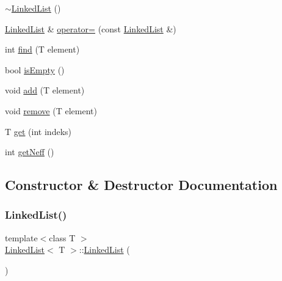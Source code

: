 \begin{DoxyCompactItemize}
\mbox{\hyperlink{classLinkedList_a7c37609df3b83bc4eb0281b852f93fd7}{$\sim$\+Linked\+List}} ()
\item 
\mbox{\hyperlink{classLinkedList}{Linked\+List}} \& \mbox{\hyperlink{classLinkedList_a690c97c1ac796f5cbf0a28bd67fc474c}{operator=}} (const \mbox{\hyperlink{classLinkedList}{Linked\+List}} \&)
\item 
int \mbox{\hyperlink{classLinkedList_a924e217dd525b84492e9f0dc61db96bc}{find}} (T element)
\item 
bool \mbox{\hyperlink{classLinkedList_a7ecbb28e82117a680839ed0dc28ebdce}{is\+Empty}} ()
\item 
void \mbox{\hyperlink{classLinkedList_ab7364799e5965dd59d4f5952cb953287}{add}} (T element)
\item 
void \mbox{\hyperlink{classLinkedList_a6c4973ae9956ddb037a9093cffa2adb1}{remove}} (T element)
\item 
T \mbox{\hyperlink{classLinkedList_a0f812c8aa5443a800c4e3c4bcb5542fa}{get}} (int indeks)
\item 
int \mbox{\hyperlink{classLinkedList_a0f1bf5709295784ae18271b88af50f88}{get\+Neff}} ()
\end{DoxyCompactItemize}


\subsection{Constructor \& Destructor Documentation}
\mbox{\label{classLinkedList_a3c20fcfec867e867f541061a09fc640c}} 
\subsubsection{\texorpdfstring{LinkedList()}{LinkedList()}\hspace{0.1cm}{\footnotesize\ttfamily [1/4]}}
{\footnotesize\ttfamily template$<$class T $>$ \\
\mbox{\hyperlink{classLinkedList}{Linked\+List}}$<$ T $>$\+::\mbox{\hyperlink{classLinkedList}{Linked\+List}} (\begin{DoxyParamCaption}{ }\end{DoxyParamCaption})}

\mbox{\label{classLinkedList_af82224d7ec3e1a5779e9385bf058b6b5}} 
